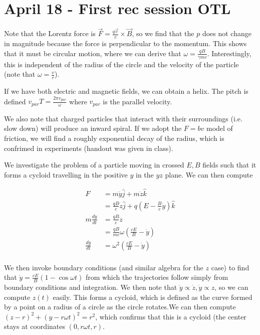 \documentclass[12pt]{article}
\begin{document}
\doublespace
\pagestyle{fancy}
\setlength{\headheight}{15pt}

\section{April 18 - First rec session OTL}

Note that the Lorentz force is $\vec{F} = \frac{q\vec{v}}{c} \times \vec{B}$, so we find that the $p$ does not change in magnitude because the force is perpendicular to the momentum. This shows that it must be circular motion, where we can derive that $\omega = \frac{qB}{\gamma mc}$. Interestingly, this is independent of the radius of the circle and the velocity of the particle (note that $\omega = \frac{v}{r}$).

If we have both electric and magnetic fields, we can obtain a helix. The pitch is defined $v_{par}T = \frac{2\pi v_{par}}{\omega}$ where $v_{par}$ is the parallel velocity. 

We also note that charged particles that interact with their surroundings (i.e. slow down) will produce an inward spiral. If we adopt the $F=bv$ model of friction, we will find a roughly exponential decay of the radius, which is confrimed in experiments (handout was given in class). 

We investigate the problem of a particle moving in crossed $E,B$ fields such that it forms a cycloid travelling in the positive $y$ in the $yz$ plane. We can then compute

\begin{align*}
	F &= m\ddot{y} \hat{j} + m\ddot{z}\hat{k}\\
	&= \frac{qB}{c}\dot{z}\hat{j} + q(E - \frac{B}{c}\dot{y})\hat{k}\\
	m\frac{d \ddot{y}}{dt} &= \frac{qB}{c}\ddot{z}\\
	&= \frac{qB}{mc}\omega\left(\frac{cE}{B}-\dot{y}\right)\\
	\frac{d \ddot{y}}{dt} &= \omega^2\left(\frac{cE}{B} - \dot{y}\right)\\
\end{align*}

We then invoke boundary conditions (and similar algebra for the $z$ case) to find that $\dot{y} = \frac{cE}{B}(1-\cos\omega t)$ from which the trajectories follow simply from boundary conditions and integration. We then note that $\ddot{y} \propto \dot{z}, \dot{y} \propto z$, so we can compute $z(t)$ easily. This forms a cycloid, which is defined as the curve formed by a point on a radius of a circle as the circle rotates.We can then compute $(z-r)^2 + (y-r\omega t)^2 = r^2$, which confirms that this is a cycloid (the center stays at coordinates $(0,r\omega t, r)$.
\end{document}
